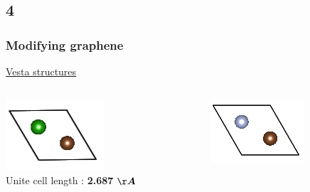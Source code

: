 \documentclass{beamer}
\begin{document}
	\subsection*{4}
		\begin{frame}
			\frametitle{Modifying graphene}
			\underline{Vesta structures}
			\begin{columns}[T] %
				\begin{column}{.28\textwidth}
					\centering
					\includegraphics[width=\textwidth]{figures/GrapheneBor1_20A.png} \\
					Unite cell length : \textbf{2.687} $\boldsymbol{\AA}$
				\end{column}%
				\hfill%
				\begin{column}{.28\textwidth}
					\centering
					\includegraphics[width=\textwidth]{figures/GrapheneNitrogen1_20A.png} \\

\end{column}
\end{columns}
\end{frame}
\end{document}
